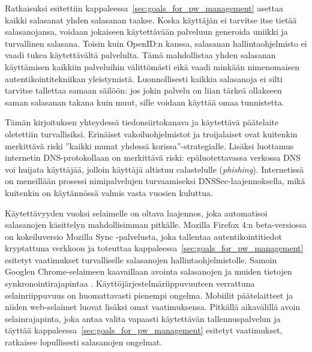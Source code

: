 \documentclass{tktltiki}
\begin{document}
Ratkaisuksi esitettiin kappaleessa~\ref{sec:goals_for_pw_management} asettaa kaikki salasanat yhden salasanan taakse. Koska käyttäjän ei tarvitse itse tietää salasanojansa, voidaan jokaiseen käytettävään palveluun generoida uniikki ja turvallinen salasana. Toisin kuin OpenID:n kanssa, salasanan hallintaohjelmisto ei vaadi tukea käytettävältä palvelulta. Tämä mahdollistaa yhden salasanan käyttämisen kaikkiin palveluihin välittömästi eikä vaadi minkään nimenomaisen autentikointitekniikan yleistymistä. Luonnollisesti kaikkia salasanoja ei silti tarvitse tallettaa samaan säilöön: jos jokin palvelu on liian tärkeä ollakseen saman salasanan takana kuin muut, sille voidaan käyttää omaa tunnistetta.

Tämän kirjoituksen yhteydessä tiedonsiirtokanava ja käytettävä päätelaite oletettiin turvallisiksi. Erinäiset vakoiluohjelmistot ja troijalaiset ovat kuitenkin merkittävä riski ''kaikki munat yhdessä korissa''-strategialle. Lisäksi luottamus internetin DNS-protokollaan on merkittävä riski: epäluotettavassa verkossa DNS voi huijata käyttäjää, jolloin käyttäjä altistuu calastelulle (\emph{phishing}). 
Internetissä on meneillään prosessi nimipalvelujen turvaamiseksi DNSSec-laajennoksella, mikä kuitenkin on käytännössä valmis vasta vuosien kuluttua.

Käytettävyyden vuoksi selaimelle on oltava laajennos, joka automatisoi salasanojen käsittelyn mahdollisimman
pitkälle. Mozilla Firefox 4:n beta-versiossa on kokeiluversio Mozilla Sync -palvelusta, joka tallentaa
autentikointitiedot kryptattuna verkkoon ja toteuttaa kappaleessa~\ref{sec:goals_for_pw_management} esitetyt
vaatimukset turvalliselle salasanojen hallintaohjelmistolle. Samoin Googlen Chrome-selaimeen kaavaillaan avointa
salasanojen ja muiden tietojen synkronointirajapintaa \cite{chromium_sync_09}. Käyttöjärjestelmäriippuvuuteen
verrattuna selainriippuvuus on huomattavasti pienempi ongelma. Mobiilit päätelaitteet ja niiden web-selaimet
luovat lisäksi omat vaatimuksensa. Pitkällä aikavälillä avoin selainrajapinta, joka antaa valita vapaasti käytettävän tallennuspalvelun ja täyttää kappaleessa~\ref{sec:goals_for_pw_management} esitetyt vaatimukset, ratkaisee lopullisesti salasanojen ongelmat.





\lastpage
\end{document}
